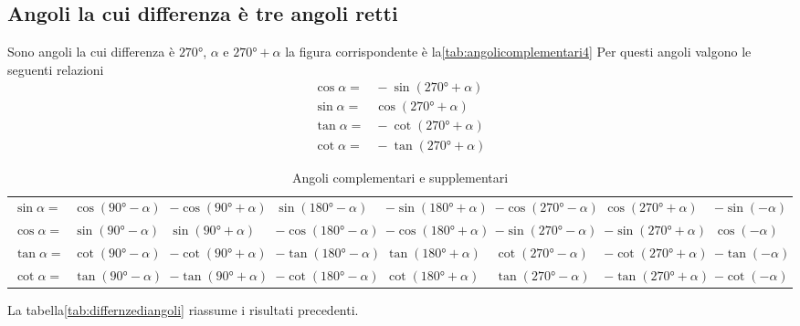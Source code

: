 \subsection{Angoli la cui differenza è tre angoli retti}
Sono angoli la cui differenza è $\ang{270}$, $\alpha$ e $\ang{270}+\alpha$ la figura corrispondente è la\nobs\vref{tab:angolicomplementari4}
%		
Per questi angoli valgono le seguenti relazioni
\begin{align*}
\cos\alpha=&{}-\sin(\ang{270}+\alpha)\\
\sin\alpha=&{}\cos(\ang{270}+\alpha)\\
\tan\alpha=&{}-\cot(\ang{270}+\alpha)\\
\cot\alpha=&{}-\tan(\ang{270}+\alpha)
\end{align*}
\begin{table}
\centering
	\footnotesize
	\begin{tabular}{rlllllll}
	\toprule
	$\sin\alpha=$&$\cos(\ang{90}-\alpha)$&$-\cos(\ang{90}+\alpha)$&$\sin(\ang{180}-\alpha)$&$-\sin(\ang{180}+\alpha)$&$-\cos(\ang{270}-\alpha)$&$\cos(\ang{270}+\alpha)$&$-\sin(-\alpha)$\\[.6cm] 
	$\cos\alpha=$&$\sin(\ang{90}-\alpha)$&$\sin(\ang{90}+\alpha)$&$-\cos(\ang{180}-\alpha)$&$-\cos(\ang{180}+\alpha)$&$-\sin(\ang{270}-\alpha)$&$-\sin(\ang{270}+\alpha)$&$\cos(-\alpha)$\\[.6cm] 
	$\tan\alpha=$&$\cot(\ang{90}-\alpha)$&$-\cot(\ang{90}+\alpha)$&$-\tan(\ang{180}-\alpha)$&$\tan(\ang{180}+\alpha)$&$\cot(\ang{270}-\alpha)$&$-\cot(\ang{270}+\alpha)$&$-\tan(-\alpha)$\\[.6cm] 
	$\cot\alpha=$&$\tan(\ang{90}-\alpha)$&$-\tan(\ang{90}+\alpha)$&$-\cot(\ang{180}-\alpha)$&$\cot(\ang{180}+\alpha)$&$\tan(\ang{270}-\alpha)$&$-\tan(\ang{270}+\alpha)$&$-\cot(-\alpha)$\\[.6cm]
	\bottomrule
	\end{tabular}
	\caption{Angoli complementari e supplementari}\label{tab:differnzediangoli}
\end{table}
La tabella\nobs\vref{tab:differnzediangoli} riassume i risultati precedenti.
